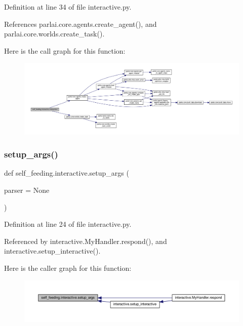 Definition at line 34 of file interactive.\+py.



References parlai.\+core.\+agents.\+create\+\_\+agent(), and parlai.\+core.\+worlds.\+create\+\_\+task().

Here is the call graph for this function\+:
\nopagebreak
\begin{figure}[H]
\begin{center}
\leavevmode
\includegraphics[width=350pt]{namespaceself__feeding_1_1interactive_ab6a36a59956d8f1381be1f0bf62dbb32_cgraph}
\end{center}
\end{figure}
\mbox{\label{namespaceself__feeding_1_1interactive_a41738b6079e2f4bfb331d7794d39ada4}} 
\subsubsection{\texorpdfstring{setup\+\_\+args()}{setup\_args()}}
{\footnotesize\ttfamily def self\+\_\+feeding.\+interactive.\+setup\+\_\+args (\begin{DoxyParamCaption}\item[{}]{parser = {\ttfamily None} }\end{DoxyParamCaption})}



Definition at line 24 of file interactive.\+py.



Referenced by interactive.\+My\+Handler.\+respond(), and interactive.\+setup\+\_\+interactive().

Here is the caller graph for this function\+:
\nopagebreak
\begin{figure}[H]
\begin{center}
\leavevmode
\includegraphics[width=350pt]{namespaceself__feeding_1_1interactive_a41738b6079e2f4bfb331d7794d39ada4_icgraph}
\end{center}
\end{figure}


